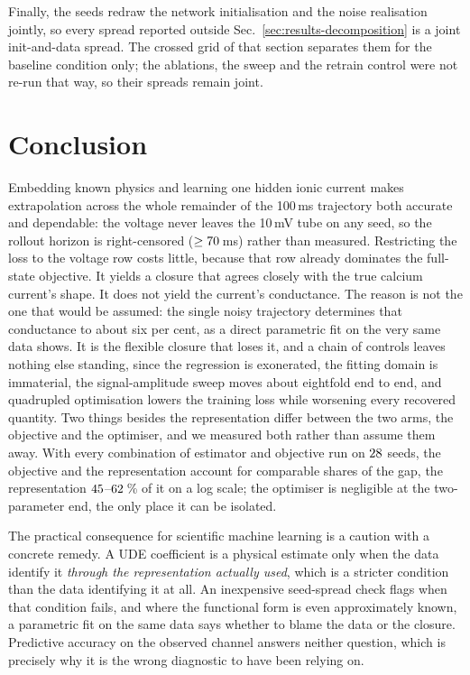 \documentclass{article}
\newcommand{\Tfull}{100}       %
\newcommand{\Ttube}{10}        %
\begin{document}
Finally, the seeds redraw the network initialisation and the noise realisation
jointly, so every spread reported outside
Sec.~\ref{sec:results-decomposition} is a joint init-and-data spread. The
crossed grid of that section separates them for the baseline condition only; the
ablations, the sweep and the retrain control were not re-run that way, so their
spreads remain joint.

\section{Conclusion}
\label{sec:conclusion}

Embedding known physics and learning one hidden ionic current makes extrapolation
across the whole remainder of the \Tfull\,ms trajectory both accurate and
dependable: the voltage never leaves the \Ttube\,mV tube on any seed, so the
rollout horizon is right-censored ($\ge 70$\,ms) rather than
measured. Restricting the loss to the voltage row costs little, because that row
already dominates the full-state objective. It yields a closure that agrees
closely with the true calcium current's shape.
It does not yield the current's conductance. The reason is not the one that would
be assumed: the single noisy trajectory determines that conductance to about six
per cent, as a direct parametric fit on the very same data shows. It is the
flexible closure that loses it, and a chain of controls leaves nothing else
standing, since the regression is exonerated, the fitting domain is immaterial,
the signal-amplitude sweep moves about eightfold end to end, and quadrupled
optimisation lowers the training loss while worsening every recovered quantity.
Two things besides the representation differ between the two arms, the objective
and the optimiser, and we measured both rather than assume them away. With every
combination of estimator and objective run on $28$ seeds, the objective
and the representation account for comparable shares of the gap, the
representation $45$--$62$\,\% of it on a log
scale; the optimiser is negligible at the two-parameter end, the only place it can
be isolated.

The practical consequence for scientific machine learning is a caution with a
concrete remedy. A UDE coefficient is a physical estimate only when the data
identify it \emph{through the representation actually used}, which is a stricter
condition than the data identifying it at all. An inexpensive seed-spread check
flags when that condition fails, and where the functional form is even
approximately known, a parametric fit on the same data says whether to blame the
data or the closure. Predictive accuracy on the observed channel answers neither
question, which is precisely why it is the wrong diagnostic to have been relying
on.
\end{document}
